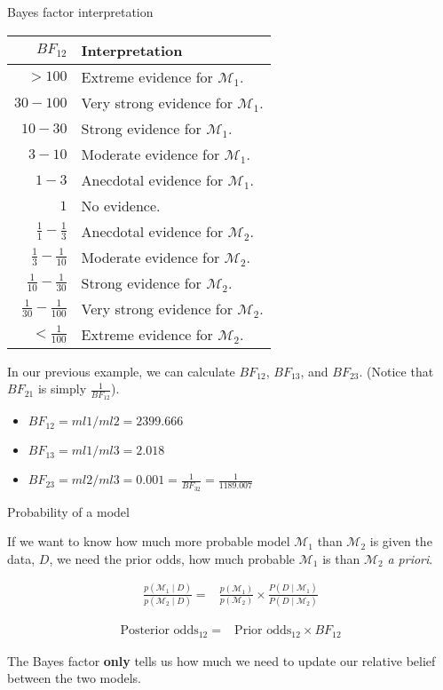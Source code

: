 \documentclass[12pt,ignorenonframetext,aspectratio=169]{beamer}
\providecommand{\tightlist}{%
  \setlength{\itemsep}{0pt}\setlength{\parskip}{0pt}}
\begin{document}
\begin{frame}{Bayes factor interpretation}
\protect\hypertarget{bayes-factor-interpretation}{}

\footnotesize

\begin{longtable}[]{@{}rl@{}}
\toprule
\(BF_{12}\) & Interpretation\tabularnewline
\midrule
\endhead
\(>100\) & Extreme evidence for \(\mathcal{M}_1\).\tabularnewline
\(30-100\) & Very strong evidence for \(\mathcal{M}_1\).\tabularnewline
\(10-30\) & Strong evidence for \(\mathcal{M}_1\).\tabularnewline
\(3-10\) & Moderate evidence for \(\mathcal{M}_1\).\tabularnewline
\(1-3\) & Anecdotal evidence for \(\mathcal{M}_1\).\tabularnewline
\(1\) & No evidence.\tabularnewline
\(\frac{1}{1}-\frac{1}{3}\) & Anecdotal evidence for \(\mathcal{M}_2\).\tabularnewline
\(\frac{1}{3}-\frac{1}{10}\) & Moderate evidence for \(\mathcal{M}_2\).\tabularnewline
\(\frac{1}{10}-\frac{1}{30}\) & Strong evidence for \(\mathcal{M}_2\).\tabularnewline
\(\frac{1}{30}-\frac{1}{100}\) & Very strong evidence for \(\mathcal{M}_2\).\tabularnewline
\(<\frac{1}{100}\) & Extreme evidence for \(\mathcal{M}_2\).\tabularnewline
\bottomrule
\end{longtable}

\end{frame}

\begin{frame}

In our previous example, we can calculate \(BF_{12}\), \(BF_{13}\), and \(BF_{23}\). (Notice that \(BF_{21}\) is simply \(\frac{1}{BF_{12}}\)).

\begin{itemize}
\tightlist
\item
  \(BF_{12} = ml1/ml2 = 2399.666\)
\item
  \(BF_{13} = ml1/ml3= 2.018\)
\item
  \(BF_{23} = ml2/ml3 = 0.001 = \frac{1}{BF_{32}} = \frac{1}{1189.007}\)
\end{itemize}

\end{frame}

\begin{frame}{Probability of a model}
\protect\hypertarget{probability-of-a-model}{}

If we want to know how much more probable model \(\mathcal{M}_1\) than \(\mathcal{M}_2\) is given the data, \(D\), we need the prior odds, how much probable \(\mathcal{M}_1\) is than \(\mathcal{M}_2\) \emph{a priori}.

\begin{align}
\frac{p(\mathcal{M}_1 \mid D)}{p(\mathcal{M}_2 \mid D)} =& \frac{p(\mathcal{M}_1)}{p(\mathcal{M}_2)} \times \frac{P(D\mid \mathcal{M}_1)}{P(D\mid \mathcal{M}_2)}
\end{align}

\begin{align}
\text{Posterior odds}_{12} = & \text{Prior odds}_{12} \times BF_{12}
\end{align}

The Bayes factor \textbf{only} tells us how much we need to update our relative belief between the two models.

\end{frame}
\end{document}

